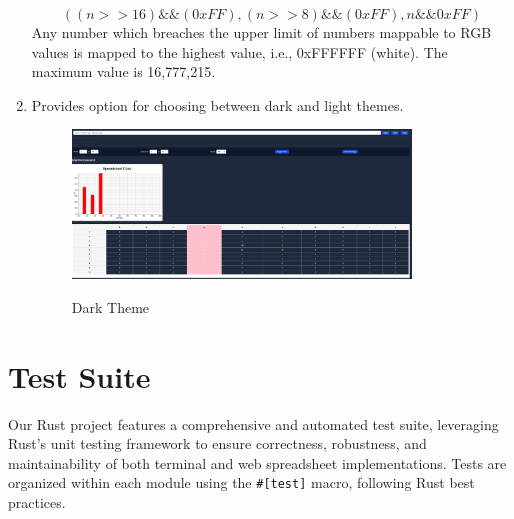 \documentclass{article}
\begin{document}
\begin{enumerate}
    $$((n>>16) \&\& (0xFF), (n>>8) \&\& (0xFF), n \&\& 0xFF)$$
    Any number which breaches the upper limit of numbers mappable to RGB values is mapped to the highest value, i.e., 0xFFFFFF (white). The maximum value is 16,777,215.
    \item Provides option for choosing between dark and light themes.
    \begin{figure}[t]
    \centering
    {{\includegraphics[width=9cm]{theme.jpg}}}
    \caption{Dark Theme}
    \end{figure}
\end{enumerate}

\section{Test Suite}

Our Rust project features a comprehensive and automated test suite, leveraging Rust's unit testing framework to ensure correctness, robustness, and maintainability of both terminal and web spreadsheet implementations. Tests are organized within each module using the \texttt{#[test]} macro, following Rust best practices.
\end{document}
